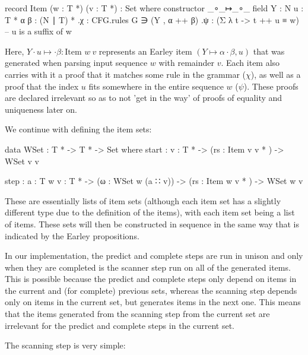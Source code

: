 		\begin{code}

			record Item (w : T *) (v : T *) : Set where
			  constructor _∘_↦_∘_
			  field
			    Y : N
			    u : T *
			    α β : (N ∣ T) *
			    .{χ} : CFG.rules G ∋ (Y , α ++ β)
			    .{ψ} : (Σ λ t -> t ++ u ≡ w)        -- u is a suffix of w
	
		\end{code}
		
		Here, $Y \cdot u \mapsto \cdot \beta : \textrm{Item } w\ v$ represents
		an Earley item $(Y \mapsto \alpha \cdot \beta , u)$ that was generated
		when parsing input sequence $w$ with remainder $v$. Each item also 
		carries with it a proof that it matches some rule in the grammar 
		($\chi$), as well as a proof that the index $u$ fits somewhere in the 
		entire sequence $w$ ($\psi$). These proofs are declared irrelevant so 
		as to not 'get in the way' of proofs of equality and uniqueness later 
		on.

		We continue with defining the item sets:
	
		\begin{code}
	
			data WSet : T * -> T * -> Set where
			  start : {v : T *} ->
			    (rs : Item v v * ) ->
			    WSet v v
			
			  step : {a : T} {w v : T *} ->
			    (ω : WSet w (a ∷ v)) ->
			    (rs : Item w v * ) ->
			    WSet w v
	
		\end{code}
		
		These are essentially lists of item sets (although each item set has a 
		slightly different type due to the definition of the items), with each 
		item set being a list of items. These sets will then be constructed in 
		sequence in the same way that is indicated by the Earley propositions.
		
		In our implementation, the predict and complete steps are run in unison
		and only when they are completed is the scanner step run on all of the 
		generated items. This is possible because the predict and complete 
		steps only depend on items in the current and (for complete) previous 
		sets, whereas the scanning step depends only on items in the current 
		set, but generates items in the next one. This means that the items 
		generated from the scanning step from the current set are irrelevant 
		for the predict and complete steps in the current set.

		The scanning step is very simple:
		
